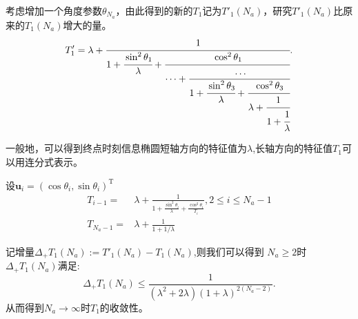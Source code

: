     \begin{frame}
     考虑增加一个角度参数$\theta_{N_a}$，由此得到的新的$T_1$记为$T'_1(N_a)$，研究$T'_1(N_a)$比原来的$T_1(N_a)$增大的量。
 \begin{equation*}
T'_1=\lambda+\cfrac{1}{1+\cfrac{\sin^2 \theta_1}{\lambda}+\cfrac{\cos^2\theta_1}{\dots+\cfrac{\dots}{1+\cfrac{\sin^2 \theta_3}{\lambda}+\cfrac{\cos^2\theta_3}{\lambda+\cfrac{1}{1+\cfrac{1}{\lambda}}}
}}}.
     \end{equation*}
 \raggedright{
}

  \end{frame}
\begin{frame}
一般地，可以得到终点时刻信息椭圆短轴方向的特征值为$\lambda$,长轴方向的特征值$T_1$可以用连分式表示。

设$\bm{u}_i=(\cos\theta_i,\sin\theta_i)^{\textrm{T}}$
\begin{equation*}
\begin{split}
T_{i-1} =& \lambda + \frac{1}{1+\frac{\sin^2\theta_i}{\lambda}+\frac{\cos^2\theta_i}{T_i}},2\leq i\leq N_a-1\\
T_{N_a-1}  =& \lambda+\frac{1}{1+1/\lambda}
\end{split}
\end{equation*}

\pause
记增量$\Delta_+ T_1(N_a):=T'_1(N_a)-T_1(N_a)$,则我们可以得到
$N_a\geq 2$时$\Delta_+ T_1(N_a)$满足:
\begin{equation*}
\Delta_+ T_1(N_a)\leq \frac{1}{(\lambda^2+2\lambda)(1+\lambda)^{2(N_a-2)}}.
\end{equation*}
从而得到$N_a\to \infty$时$T_1$的收敛性。
\end{frame}
